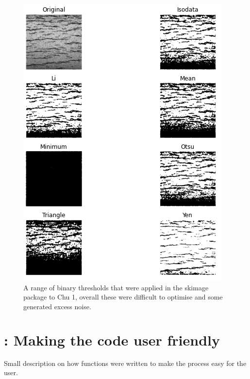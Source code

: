 \documentclass{article}
\begin{document}
\begin{figure}[h]
	    \centering
	    \includegraphics[scale=0.7]{Figures/skimage_thresholds.png}
	    \caption{A range of binary thresholds that were applied in the skimage package to Chu 1, overall these were difficult to optimise and some generated excess noise.}
	    \label{fig:skimage_threshold}
	\end{figure}
	
\section{: Making the code user friendly}
Small description on how functions were written to make the process easy for the user.
\end{document}
